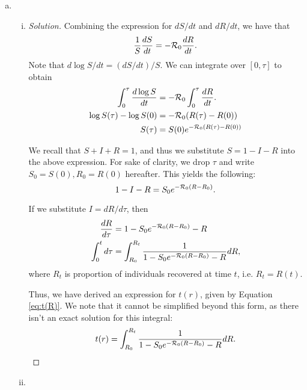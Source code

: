 \documentclass[12pt]{article}
\begin{document}
\begin{enumerate}[(a)]
\item \basicSIRanalQb
  \begin{enumerate}[(i)]
  \item \basicSIRanalQbi

{\color{blue}
\begin{proof}[Solution]
Combining the expression for $dS/dt$ and $dR/dt$, we have that
\begin{equation*}
\frac{1}{S} \frac{dS}{dt} = - {\cal R}_0 \frac{dR}{dt}.
\end{equation*}
Note that $d \log S/dt = (dS/dt)/S$. We can integrate over $[0, \tau]$ to obtain
\begin{equation}\label{eq:S(R)}
\begin{aligned} 
\int_0^\tau \frac{d\log S}{dt} &= - {\cal R}_0 \int_0^\tau \frac{dR}{dt}.\\
\log S(\tau) - \log S(0) &= - {\cal R}_0(R(\tau) -R(0)) \\
S(\tau) &= S(0) e^{-{\cal R}_0(R(\tau)-R(0))}
\end{aligned}
\end{equation}

We recall that $S+I+R=1$, and thus we substitute $S=1-I-R$ into the above expression. For sake of clarity, we drop $\tau$ and write $S_0 = S(0), R_0 = R(0)$ hereafter. This yields the following:
\begin{equation*}
1-I-R=S_0e^{-{\cal R}_0(R-R_0)}.
\end{equation*}

If we substitute $I = dR/d\tau$, then 
\begin{equation*}
\begin{aligned}
\frac{dR}{d\tau}&=1-S_0e^{-{\cal R}_0(R -R_0 )}-R \\
\int_0^t d\tau&=\int_{R_0}^{R_t} \frac{1}{1-S_0e^{-{\cal R}_0(R-R_0)}-R} dR,
\end{aligned}
\end{equation*}
where $R_t$ is proportion of individuals recovered at time $t$, i.e. $R_t = R(t)$.

Thus, we have derived an expression for $t(r)$, given by Equation \eqref{eq:t(R)}. We note that it cannot be simplified beyond this form, as there isn't an exact solution for this integral:
\begin{equation}
\label{eq:t(R)}
t(r)=\int_{R_0}^{R_t} \frac{1}{1-S_0e^{-{\cal R}_0(R-R_0)}-R} dR.
\end{equation}
\end{proof}
}

 \item \basicSIRanalQbii


\end{enumerate}
\end{enumerate}
\end{document}
